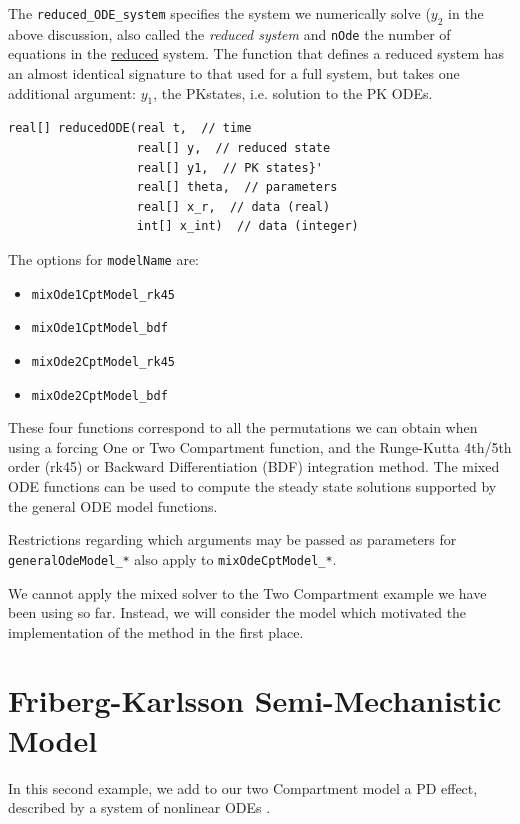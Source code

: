 \documentclass[11pt, reqno]{amsbook}
\numberwithin{section}{chapter}
\theoremstyle{remark}
\begin{document}
The \texttt{reduced\_ODE\_system} specifies the system we
numerically solve (\(y_2\) in the above discussion, also called the
\emph{reduced system} and \texttt{nOde} the number of equations in
the \underline{reduced} system. The function that defines a reduced
system has an almost identical signature to that used for a full
system, but takes one additional argument: \(y_1\), the PKstates,
i.e. solution to the PK ODEs.
\begin{verbatim}
real[] reducedODE(real t,  // time
                  real[] y,  // reduced state
                  real[] y1,  // PK states}'
                  real[] theta,  // parameters
                  real[] x_r,  // data (real)
                  int[] x_int)  // data (integer)
\end{verbatim}

The options for \texttt{modelName} are:
\begin{itemize}
\item \texttt{mixOde1CptModel\_rk45}
\item \texttt{mixOde1CptModel\_bdf}
\item \texttt{mixOde2CptModel\_rk45}
\item \texttt{mixOde2CptModel\_bdf}
\end{itemize}

These four functions correspond to all the permutations we can obtain
when using a forcing One or Two Compartment function, and the
Runge-Kutta 4th/5th order (rk45) or Backward Differentiation (BDF)
integration method. The mixed ODE functions can be used to compute the
steady state solutions supported by the general ODE model functions.

Restrictions regarding which arguments may be passed as parameters for
\texttt{generalOdeModel\_*} also apply to
\texttt{mixOdeCptModel\_*}.

We cannot apply the mixed solver to the Two Compartment example we
have been using so far. Instead, we will consider the model which
motivated the implementation of the method in the first place.

\section{Friberg-Karlsson Semi-Mechanistic Model}
\label{sec:org6cf1968}
In this second example, we add to our two Compartment model a PD
effect, described by a system of nonlinear ODEs \cite{friberg_mechanistic_2003}.
\end{document}
